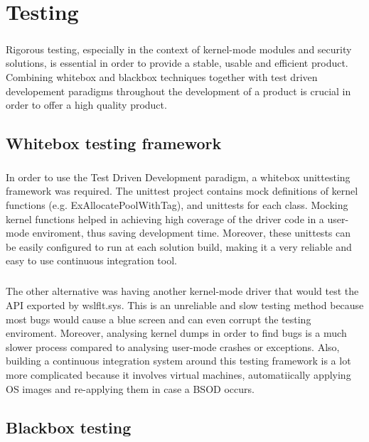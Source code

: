 \chapter{Testing}
    \paragraph{}
    Rigorous testing, especially in the context of kernel-mode modules and security solutions, is essential in order to provide a stable,
    usable and efficient product. Combining whitebox and blackbox techniques together with test driven developement paradigms throughout
    the development of a product is crucial in order to offer a high quality product.
    \section{Whitebox testing framework}
        \paragraph{}
        In order to use the Test Driven Development paradigm, a whitebox unittesting framework was required. The unittest project contains
        mock definitions of kernel functions (e.g. ExAllocatePoolWithTag), and unittests for each class. Mocking kernel functions helped in
        achieving high coverage of the driver code in a user-mode enviroment, thus saving development time. Moreover, these unittests can be
        easily configured to run at each solution build, making it a very reliable and easy to use continuous integration tool.
        \paragraph{}
        The other alternative was having another kernel-mode driver that would test the API exported by wslflt.sys. This is an unreliable
        and slow testing method because most bugs would cause a blue screen and can even corrupt the testing enviroment. Moreover, analysing
        kernel dumps in order to find bugs is a much slower process compared to analysing user-mode crashes or exceptions. Also, building a
        continuous integration system around this testing framework is a lot more complicated because it involves virtual machines,
        automatiically applying OS images and re-applying them in case a BSOD occurs.
    \section{Blackbox testing}
